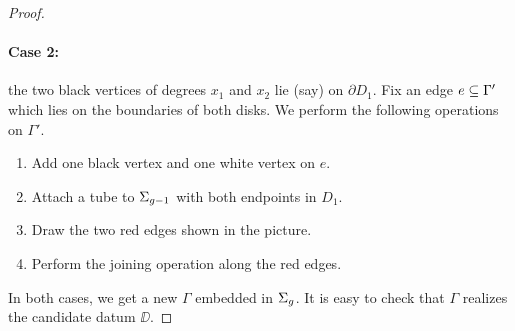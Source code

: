 \begin{proof}
\paragraph{Case 2:} the two black vertices of degrees $x_1$ and $x_2$ lie (say) on $\partial D_1$. Fix an edge $e\subseteq\Gamma'$ which lies on the boundaries of both disks. We perform the following operations on $\Gamma'$.
\begin{enumerate}[(1)]
\item Add one black vertex and one white vertex on $e$.
\item Attach a tube to $\Sigma_{g-1}$ with both endpoints in $D_1$.
\item Draw the two red edges shown in the picture.
\item Perform the joining operation along the red edges.
\end{enumerate}

In both cases, we get a new \dessin{} $\Gamma$ embedded in $\Sigma_{g}$. It is easy to check that $\Gamma$ realizes the candidate datum $\DD$.
\end{proof}

